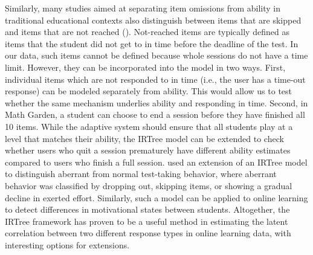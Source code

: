 \documentclass[manuscript]{acmart}
\begin{document}
Similarly, many studies aimed at separating item omissions from ability in traditional educational contexts also distinguish between items that are skipped and items that are not reached (\cite{glas2008modeling, pohl2014dealing, debeer2017modeling}). Not-reached items are typically defined as items that the student did not get to in time before the deadline of the test. In our data, such items cannot be defined because whole sessions do not have a time limit. However, they can be incorporated into the model in two ways. First, individual items which are not responded to in time (i.e., the user has a time-out response) can be modeled separately from ability. This would allow us to test whether the same mechanism underlies ability and responding in time. Second, in Math Garden, a student can choose to end a session before they have finished all 10 items. While the adaptive system should ensure that all students play at a level that matches their ability, the IRTree model can be extended to check whether users who quit a session prematurely have different ability estimates compared to users who finish a full session. \citet{huang2020mixture} used an extension of an IRTree model to distinguish aberrant from normal test-taking behavior, where aberrant behavior was classified by dropping out, skipping items, or showing a gradual decline in exerted effort. Similarly, such a model can be applied to online learning to detect differences in motivational states between students. Altogether, the IRTree framework has proven to be a useful method in estimating the latent correlation between two different response types in online learning data, with interesting options for extensions.

\end{document}
